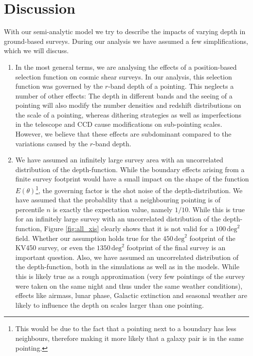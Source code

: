 \documentclass[referee]{aa} %
\renewcommand{\[}{\begin{equation}}
\renewcommand{\]}{\end{equation}}
\renewcommand{\rm}{\mathrm}
\begin{document}
\section{Discussion}
\label{sec:discussion}
With our semi-analytic model we try to describe the impacts of varying depth in ground-based surveys. During our analysis we have assumed a few simplifications, which we will discuss.
\begin{enumerate}
\item In the most general terms, we are analysing the effects of a position-based selection function on cosmic shear surveys. In our analysis, this selection function was governed by the $r$-band depth of a pointing. This neglects a number of other effects: The depth in different bands and the seeing of a pointing will also modify the number densities and redshift distributions on the scale of a pointing, whereas dithering strategies as well as imperfections in the telescope and CCD cause modifications on sub-pointing scales. However, we believe that these effects are subdominant compared to the variations caused by the $r$-band depth.

\item We have assumed an infinitely large survey area with an uncorrelated distribution of the depth-function. While the boundary effects arising from a finite survey footprint would have a small impact on the shape of the function $E(\theta)$\footnote{This would be due to the fact that a pointing next to a boundary has less neighbours, therefore making it more likely that a galaxy pair is in the same pointing.}, the governing factor is the shot noise of the depth-distribution. We have assumed that the probability that a neighbouring pointing is of percentile $n$ is exactly the expectation value, namely $1/10$. While this is true for an infinitely large survey with an uncorrelated distribution of the depth-function, Figure \ref{fig:all_xis} clearly shows that it is not valid for a $100\,\rm{deg}^2$ field. Whether our assumption holds true for the $450\,\rm{deg}^2$ footprint of the KV450 survey, or even the $1350\,\rm{deg}^2$ footprint of the final survey is an important question. Also, we have assumed an uncorrelated distribution of the depth-function, both in the simulations as well as in the models. While this is likely true as a rough approximation (very few pointings of the survey were taken on the same night and thus under the same weather conditions), effects like airmass, lunar phase, Galactic extinction and seasonal weather are likely to influence the depth on scales larger than one pointing.


\end{enumerate}
\end{document}

